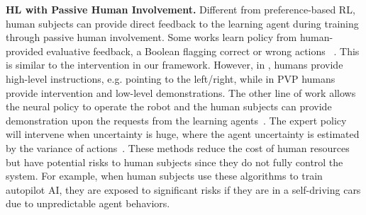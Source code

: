 \textbf{HL with Passive Human Involvement.}
Different from preference-based RL, human subjects can provide direct feedback to the learning agent during training through passive human involvement.
Some works learn policy from human-provided evaluative feedback, a Boolean flagging correct or wrong actions~
\citep{knox2012reinforcement,celemin2019interactive,najar2020interactively}. This is similar to the intervention in our framework. 
However, in \citep{najar2020interactively}, humans provide high-level instructions, e.g. pointing to the left/right, while in PVP humans provide intervention and low-level demonstrations.
The other line of work allows the neural policy to operate the robot and the human subjects can provide demonstration upon the requests from the learning agents~\citep{mandel2017add,menda2019ensembledagger,jonnavittula2021learning}.
The expert policy will intervene when uncertainty is huge, where the agent uncertainty is estimated by the variance of actions~\citep{menda2019ensembledagger}.
These methods reduce the cost of human resources but have potential risks to human subjects since they do not fully control the system.
For example, when human subjects use these algorithms to train autopilot AI, they are exposed to significant risks if they are in a self-driving cars due to unpredictable agent behaviors.


